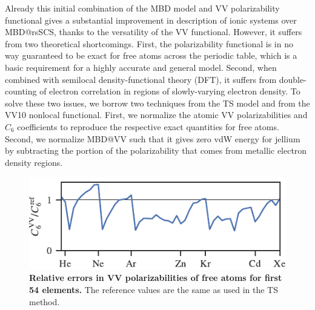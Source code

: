 Already this initial combination of the MBD model and VV polarizability functional gives a substantial improvement in description of ionic systems over MBD@rsSCS, thanks to the versatility of the VV functional.
However, it suffers from two theoretical shortcomings.
First, the polarizability functional is in no way guaranteed to be exact for free atoms across the periodic table, which is a basic requirement for a highly accurate and general model.
Second, when combined with semilocal density-functional theory (DFT), it suffers from double-counting of electron correlation in regions of slowly-varying electron density.
To solve these two issues, we borrow two techniques from the TS model and from the VV10 nonlocal functional.
First, we normalize the atomic VV polarizabilities and $C_6$ coefficients to reproduce the respective exact quantities for free atoms.
Second, we normalize MBD@VV such that it gives zero vdW energy for jellium by subtracting the portion of the polarizability that comes from metallic electron density regions.

\begin{figure}[t!]
\centering
\includegraphics{../media/vv-periodic-table.pdf}
\caption{\textbf{Relative errors in VV polarizabilities of free atoms for first 54 elements.}
The reference values are the same as used in the TS method.
}\label{fig:vv-periodic-table}
\end{figure}

